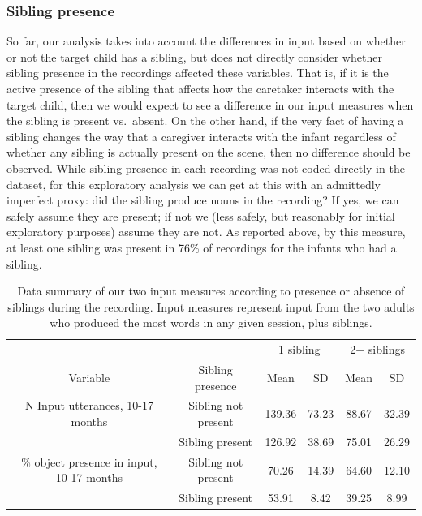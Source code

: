 \documentclass[
  man,floatsintext]{apa6}
\begin{document}
\hypertarget{sibling-presence}{%
\subsubsection{Sibling presence}\label{sibling-presence}}

So far, our analysis takes into account the differences in input based on whether or not the target child has a sibling, but does not directly consider whether sibling presence in the recordings affected these variables. That is, if it is the active presence of the sibling that affects how the caretaker interacts with the target child, then we would expect to see a difference in our input measures when the sibling is present vs.~absent. On the other hand, if the very fact of having a sibling changes the way that a caregiver interacts with the infant regardless of whether any sibling is actually present on the scene, then no difference should be observed. While sibling presence in each recording was not coded directly in the dataset, for this exploratory analysis we can get at this with an admittedly imperfect proxy: did the sibling produce nouns in the recording? If yes, we can safely assume they are present; if not we (less safely, but reasonably for initial exploratory purposes) assume they are not. As reported above, by this measure, at least one sibling was present in 76\% of recordings for the infants who had a sibling.

\begin{table}[!h]

\caption{\label{tab:sib-presence-table-data-summary}Data summary of our two input measures according to presence or absence of siblings during the recording. Input measures represent input from the two adults who produced the most words in any given session, plus siblings.}
\centering
\begin{tabular}[t]{cccccc}
\toprule
\multicolumn{2}{c}{ } & \multicolumn{2}{c}{1 sibling} & \multicolumn{2}{c}{2+ siblings} \\
\cmidrule(l{3pt}r{3pt}){3-4} \cmidrule(l{3pt}r{3pt}){5-6}
\multicolumn{1}{c}{Variable} & \multicolumn{1}{c}{Sibling presence} & \multicolumn{1}{c}{Mean} & \multicolumn{1}{c}{SD} & \multicolumn{1}{c}{Mean} & \multicolumn{1}{c}{SD} \\
\cmidrule(l{3pt}r{3pt}){1-1} \cmidrule(l{3pt}r{3pt}){2-2} \cmidrule(l{3pt}r{3pt}){3-3} \cmidrule(l{3pt}r{3pt}){4-4} \cmidrule(l{3pt}r{3pt}){5-5} \cmidrule(l{3pt}r{3pt}){6-6}
N Input utterances, 10-17 months & Sibling not present & 139.36 & 73.23 & 88.67 & 32.39\\
 & Sibling present & 126.92 & 38.69 & 75.01 & 26.29\\
\% object presence in input, 10-17 months & Sibling not present & 70.26 & 14.39 & 64.60 & 12.10\\
 & Sibling present & 53.91 & 8.42 & 39.25 & 8.99\\
\bottomrule
\end{tabular}
\end{table}
\end{document}
